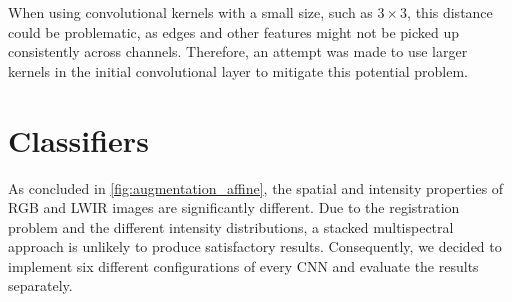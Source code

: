 \documentclass{l4proj}
\begin{document}
When using convolutional kernels with a small size, such as $3 \times 3$, this distance could be problematic, as edges and other features might not be picked up consistently across channels. Therefore, an attempt was made to use larger kernels in the initial convolutional layer to mitigate this potential problem.


\section{Classifiers}
\label{design_classifiers}

As concluded in \ref{fig:augmentation_affine}, the spatial and intensity properties of RGB and LWIR images are significantly different. Due to the registration problem and the different intensity distributions, a stacked multispectral approach is unlikely to produce satisfactory results. Consequently, we decided to implement six different configurations of every CNN and evaluate the results separately.
\end{document}
